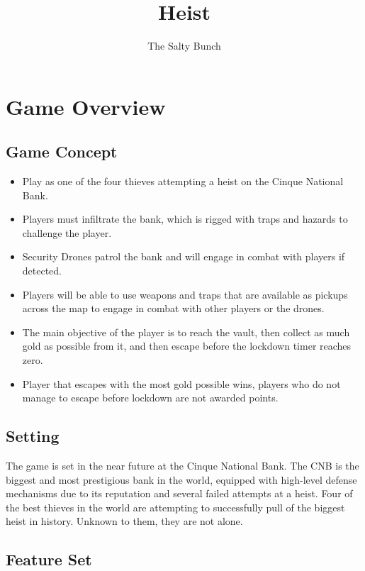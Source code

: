 \documentclass[14pt]{report}
\title{Heist}
\author{The Salty Bunch}
\begin{document}
\maketitle



\tableofcontents


\chapter{Game Overview}

\section{Game Concept}

\begin{itemize}
    \item Play as one of the four thieves attempting a heist on the Cinque National Bank.
    \item Players must infiltrate the bank, which is rigged with traps and hazards to challenge the player.
    \item Security Drones patrol the bank and will engage in combat with players if detected.
    \item Players will be able to use weapons and traps that are available as pickups across the map to engage in combat with other players or the drones.
    \item The main objective of the player is to reach the vault, then collect as much gold as possible from it, and then escape before the lockdown timer reaches zero.
    \item Player that escapes with the most gold possible wins, players who do not manage to escape before lockdown are not awarded points.
\end{itemize}

\section{Setting}

The game is set in the near future at the Cinque National Bank. The CNB is the biggest and most prestigious bank in the world, equipped with high-level defense mechanisms due to its reputation and several failed attempts at a heist. Four of the best thieves in the world are attempting to successfully pull of the biggest heist in history. Unknown to them, they are not alone.

\section{Feature Set}
\end{document}
